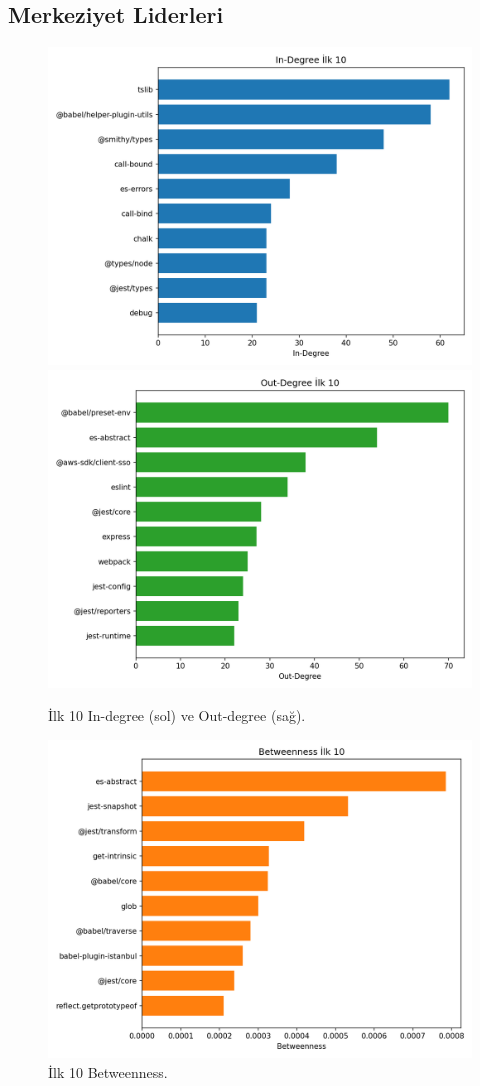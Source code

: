 \documentclass[11pt,a4paper]{article}
\begin{document}
\subsection{Merkeziyet Liderleri}
\begin{figure}[h]
  \centering
  \includegraphics[width=0.48\linewidth]{top10_in_degree.png}
  \includegraphics[width=0.48\linewidth]{top10_out_degree.png}
  \caption{İlk 10 In-degree (sol) ve Out-degree (sağ).}
\end{figure}

\begin{figure}[h]
  \centering
  \includegraphics{top10_betweenness.png}
  \caption{İlk 10 Betweenness.}
\end{figure}
\end{document}
